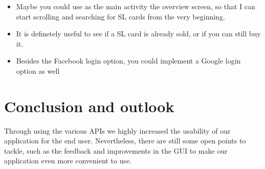\documentclass[11pt,twoside,a4paper]{report}
\begin{document}
\begin{itemize}

\item Maybe you could use as the main activity the overview screen, so that I can start scrolling and searching for SL cards from the very beginning.

\item It is definetely useful to see if a SL card is already sold, or if you can still buy it.

\item Besides the Facebook login option, you could implement a Google login option as well

\end{itemize}

\section{Conclusion and outlook}

Through using the various APIs we highly increased the usability of our application for the end user. Nevertheless, there are still some open points to tackle, such as the feedback and improvements in the GUI to make our application even more convenient to use.
\end{document}

